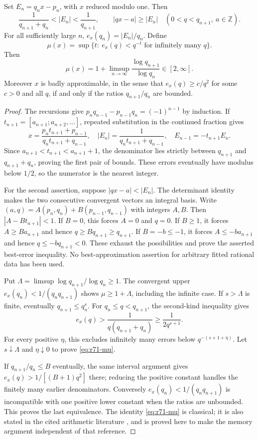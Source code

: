 \begin{lemma}\label{lem:r71-cf}
Set $E_n=q_nx-p_n$, with $x$ reduced modulo one. Then
\begin{equation}\label{eq:r71-cf-error}
 \frac1{q_{n+1}+q_n}<|E_n|<\frac1{q_{n+1}},
 \qquad
 |qx-a|\ge|E_n|\quad(0<q<q_{n+1},\ a\in\mathbb Z).
\end{equation}
For all sufficiently large $n$, $e_x(q_n)=|E_n|/q_n$. Define
\[
 \mu(x)=\sup\{t:\ e_x(q)<q^{-t}\text{ for infinitely many }q\}.
\]
Then
\begin{equation}\label{eq:r71-mu}
 \mu(x)=1+\limsup_{n\to\infty}\frac{\log q_{n+1}}{\log q_n}
       \in[2,\infty].
\end{equation}
Moreover $x$ is badly approximable, in the sense that $e_x(q)\ge c/q^2$ for some $c>0$ and all $q$, if and only if the ratios $q_{n+1}/q_n$ are bounded.
\end{lemma}
\begin{proof}
The recursions give $p_nq_{n-1}-p_{n-1}q_n=(-1)^{n-1}$ by induction. If $t_{n+1}=[a_{n+1};a_{n+2},\ldots]$, repeated substitution in the continued fraction gives
\[
 x=\frac{p_nt_{n+1}+p_{n-1}}{q_nt_{n+1}+q_{n-1}},
 \quad |E_n|=\frac1{q_nt_{n+1}+q_{n-1}},
 \quad E_{n-1}=-t_{n+1}E_n.
\]
Since $a_{n+1}<t_{n+1}<a_{n+1}+1$, the denominator lies strictly between $q_{n+1}$ and $q_{n+1}+q_n$, proving the first pair of bounds. These errors eventually have modulus below $1/2$, so the numerator is the nearest integer.

For the second assertion, suppose $|qx-a|<|E_n|$. The determinant identity makes the two consecutive convergent vectors an integral basis. Write
$(a,q)=A(p_n,q_n)+B(p_{n-1},q_{n-1})$ with integers $A,B$.
Then $|A-Bt_{n+1}|<1$. If $B=0$, this forces $A=0$ and $q=0$. If $B\ge1$, it forces $A\ge Ba_{n+1}$ and hence $q\ge Bq_{n+1}\ge q_{n+1}$. If $B=-b\le-1$, it forces $A\le-ba_{n+1}$ and hence $q\le-bq_{n+1}<0$. These exhaust the possibilities and prove the asserted best-error inequality. No best-approximation assertion for arbitrary fitted rational data has been used.

Put $\Lambda=\limsup\log q_{n+1}/\log q_n\ge1$. The convergent upper $e_x(q_n)<1/(q_nq_{n+1})$ shows $\mu\ge1+\Lambda$, including the infinite case. If $s>\Lambda$ is finite, eventually $q_{n+1}\le q_n^s$. For $q_n\le q<q_{n+1}$, the second-kind inequality gives
\[
 e_x(q)>\frac1{q(q_{n+1}+q_n)}
        \ge\frac1{2q^{s+1}}.
\]
For every positive $\eta$, this excludes infinitely many errors below $q^{-(s+1+\eta)}$. Let $s\downarrow\Lambda$ and $\eta\downarrow0$ to prove \eqref{eq:r71-mu}.

If $q_{n+1}/q_n\le B$ eventually, the same interval argument gives $e_x(q)>1/[(B+1)q^2]$ there; reducing the positive constant handles the finitely many earlier denominators. Conversely $e_x(q_n)<1/(q_nq_{n+1})$ is incompatible with one positive lower constant when the ratios are unbounded. This proves the last equivalence. The identity \eqref{eq:r71-mu} is classical; it is also stated in the cited arithmetic literature \cite{HoneVarona19}, and is proved here to make the memory argument independent of that reference.
\end{proof}

